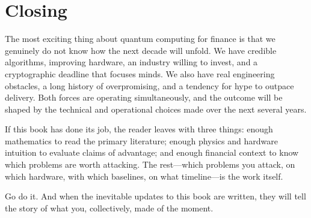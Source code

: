 \section{Closing}

The most exciting thing about quantum computing for finance is that we genuinely do not know how the next decade will unfold. We have credible algorithms, improving hardware, an industry willing to invest, and a cryptographic deadline that focuses minds. We also have real engineering obstacles, a long history of overpromising, and a tendency for hype to outpace delivery. Both forces are operating simultaneously, and the outcome will be shaped by the technical and operational choices made over the next several years.

If this book has done its job, the reader leaves with three things: enough mathematics to read the primary literature; enough physics and hardware intuition to evaluate claims of advantage; and enough financial context to know which problems are worth attacking. The rest---which problems you attack, on which hardware, with which baselines, on what timeline---is the work itself.

Go do it. And when the inevitable updates to this book are written, they will tell the story of what you, collectively, made of the moment.

\textsep
